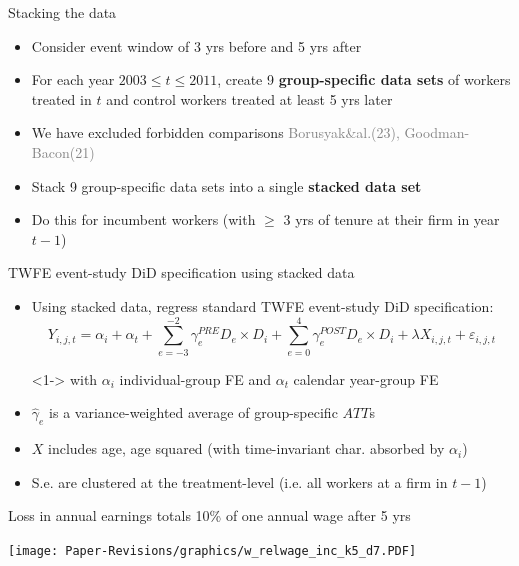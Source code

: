 \documentclass[aspectratio=169]{beamer}
\begin{document}
\begin{frame}{Stacking the data}
    \begin{itemize}
    \item<1-> Consider event window of 3 yrs before and 5 yrs after \medskip
    \item<1-> For each year $ 2003 \leq t \leq 2011 $, create 9 \textbf{group-specific data sets} of workers treated in $t$ and control workers treated at least 5 yrs later \medskip
    \item<2-> We have excluded forbidden comparisons \textcolor{gray}{\scriptsize{Borusyak\&al.(23), Goodman-Bacon(21)}} \hyperlink{forbidden}{}  \medskip
    \item<3-> Stack 9 group-specific data sets into a single \textbf{stacked data set} \medskip
    \item<4-> Do this for incumbent workers (with $ \geqslant $ 3 yrs of tenure at their firm in year $t-1$)
    \end{itemize}
\end{frame}

\begin{frame}{TWFE event-study DiD specification using stacked data}
\begin{itemize}
\item<1-> Using stacked data, regress standard TWFE event-study DiD specification:
\begin{equation} \label{eq_stackedDiD}
Y_{i,j,t} = \alpha_{i} + \alpha_{t} + \sum_{e=-3}^{-2}\gamma_{e}^{PRE} D_{e} \times D_{i} + \sum_{e=0}^{4}\gamma_{e}^{POST} D_{e} \times D_{i} + \lambda X_{i,j,t} + \varepsilon_{i,j,t} \nonumber
\end{equation}
\item[]<1-> with $ \alpha_{i}$ individual-group FE and $ \alpha_{t}$ calendar year-group FE \medskip
\item<2-> $\hat{\gamma}_{e}$ is a variance-weighted average of group-specific $ATT$s \hyperlink{otherest}{} \medskip
\item<3-> $X$ includes age, age squared (with time-invariant char. absorbed by $ \alpha_{i}$) \medskip
\item<3-> S.e. are clustered at the treatment-level (i.e. all workers at a firm in $t-1$)
\end{itemize}
\end{frame}

\begin{frame}{Loss in annual earnings totals 10\% of one annual wage after 5 yrs} 
\noindent \begin{center}
	\texttt{[image: Paper-Revisions/graphics/w\_relwage\_inc\_k5\_d7.PDF]}
   	\end{center}
\end{frame}
\end{document}
